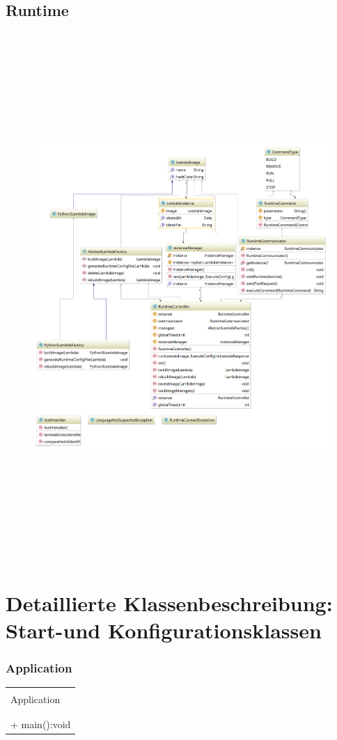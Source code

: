 \documentclass[a4paper,20pt,oneside]{book}
\begin{document}
    \subsection{Runtime}
	    \begin{figure}[!hb]
	    	\includegraphics[width=18cm,height=20cm]{runtimediagram}
	    \end{figure}
    
    
		

	\section{Detaillierte Klassenbeschreibung: Start-und Konfigurationsklassen}
	\subsubsection{Application}
	\centering
	\begin{tabular}{|l|}
	\hline \\
	Application\\
	\hline 
	\\ 
	\hline \\
	+ main():void\\
	\hline 
	\end{tabular}
	
\end{document}
